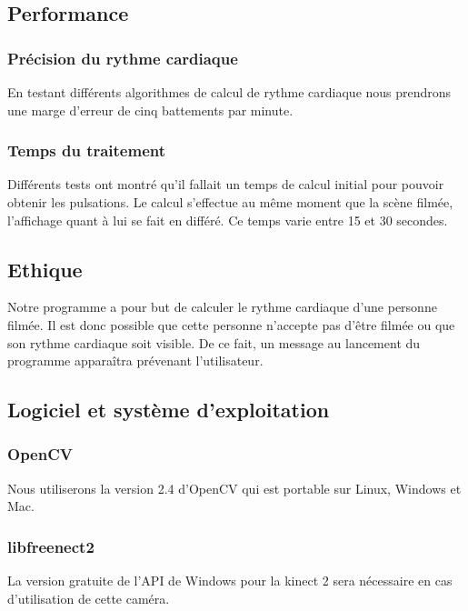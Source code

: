 \documentclass[12pt,a4paper]{article}
\begin{document}
\subsection{Performance}

\subsubsection{Précision du rythme cardiaque}

En testant différents algorithmes de calcul de rythme cardiaque nous prendrons une marge d'erreur de cinq battements par minute.
\subsubsection{Temps du traitement}

Différents tests ont montré qu'il fallait un temps de calcul initial pour pouvoir obtenir les pulsations. Le calcul s'effectue au même moment que la scène filmée, l'affichage quant à lui se fait en différé. Ce temps varie entre 15 et 30 secondes.

\subsection{Ethique}

Notre programme a pour but de calculer le rythme cardiaque d'une personne filmée. Il est donc possible que cette personne n'accepte pas d'être filmée ou que son rythme cardiaque soit visible. De ce fait, un message au lancement du programme apparaîtra prévenant l'utilisateur.
\newpage
\subsection{Logiciel et système d'exploitation}

\subsubsection{OpenCV}

Nous utiliserons la version 2.4 d'OpenCV qui est portable sur Linux, Windows et Mac.

\subsubsection{libfreenect2}

La version gratuite de l'API de Windows pour la kinect 2 sera nécessaire en cas d'utilisation de cette caméra.
\end{document}
